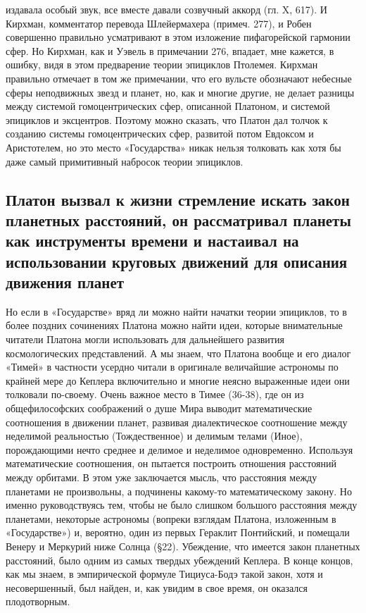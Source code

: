 издавала особый звук, все вместе давали созвучный аккорд (гл. X, 617).
И Кирхман, комментатор перевода Шлейермахера (примеч. 277), и Робен
совершенно правильно усматривают в этом изложение пифагорейской
гармонии сфер. Но Кирхман, как и Уэвель в примечании 276, впадает, мне
кажется, в ошибку, видя в этом предварение теории эпициклов Птолемея.
Кирхман правильно отмечает в том же примечании, что его вульсте
обозначают небесные сферы неподвижных звезд и планет, но, как и многие
другие, не делает разницы между системой гомоцентрических сфер,
описанной Платоном, и системой эпициклов и эксцентров. Поэтому можно
сказать, что Платон дал толчок к созданию системы гомоцентрических
сфер, развитой потом Евдоксом и Аристотелем, но это место
«Государства» никак нельзя толковать как хотя бы даже самый
примитивный набросок теории эпициклов.

\subsection{Платон вызвал к жизни стремление искать закон планетных
расстояний, он рассматривал планеты как инструменты времени и
настаивал на использовании круговых движений для описания движения
планет}

Но если в «Государстве» вряд ли можно найти начатки теории
эпициклов, то в более поздних сочинениях Платона можно найти идеи,
которые внимательные читатели Платона могли использовать для
дальнейшего развития космологических представлений. А мы знаем, что
Платона вообще и его диалог «Тимей» в частности усердно читали в
оригинале величайшие астрономы по крайней мере до Кеплера включительно
и многие неясно выраженные идеи они толковали по-своему. Очень важное
место в Тимее (36-38), где он из общефилософских соображений о душе
Мира выводит математические соотношения в движении планет, развивая
диалектическое соотношение между неделимой реальностью (Тождественное)
и делимым телами (Иное), порождающими нечто среднее и делимое и
неделимое одновременно. Используя математические соотношения, он
пытается построить отношения расстояний между орбитами. В этом уже
заключается мысль, что расстояния между планетами не произвольны, а
подчинены какому-то математическому закону. Но именно руководствуясь
тем, чтобы не было слишком большого расстояния между планетами,
некоторые астрономы (вопреки взглядам Платона, изложенным в
«Государстве») и, вероятно, один из первых Гераклит Понтийский, и
помещали Венеру и Меркурий ниже Солнца (§22). Убеждение, что имеется
закон планетных расстояний, было одним из самых твердых убеждений
Кеплера. В конце концов, как мы знаем, в эмпирической формуле
Тициуса-Бодэ такой закон, хотя и несовершенный, был найден, и, как
увидим в свое время, он оказался плодотворным.

